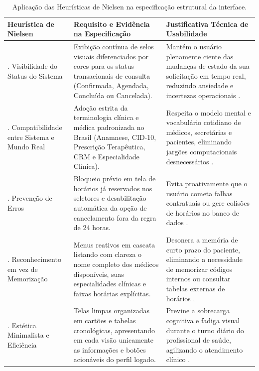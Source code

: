 \begin{table}[htbp]
\centering
\small
\caption{Aplicação das Heurísticas de Nielsen na especificação estrutural da interface.}
\label{tab:nielsen}
\begin{tabularx}{\textwidth}{|>{\RaggedRight\arraybackslash}p{4cm}|>{\RaggedRight\arraybackslash}X|>{\RaggedRight\arraybackslash}p{5.2cm}|}
\hline
\textbf{Heurística de Nielsen} & \textbf{Requisito e Evidência na Especificação} & \textbf{Justificativa Técnica de Usabilidade} \\
\hline
1. Visibilidade do Status do Sistema & Exibição contínua de selos visuais diferenciados por cores para os status transacionais de consulta (Confirmada, Agendada, Concluída ou Cancelada). & Mantém o usuário plenamente ciente das mudanças de estado da sua solicitação em tempo real, reduzindo ansiedade e incertezas operacionais \cite{nielsen1993}. \\
\hline
2. Compatibilidade entre Sistema e Mundo Real & Adoção estrita da terminologia clínica e médica padronizada no Brasil (Anamnese, CID-10, Prescrição Terapêutica, CRM e Especialidade Clínica). & Respeita o modelo mental e vocabulário cotidiano de médicos, secretárias e pacientes, eliminando jargões computacionais desnecessários \cite{norman2013}. \\
\hline
3. Prevenção de Erros & Bloqueio prévio em tela de horários já reservados nos seletores e desabilitação automática da opção de cancelamento fora da regra de 24 horas. & Evita proativamente que o usuário cometa falhas contratuais ou gere colisões de horários no banco de dados \cite{shneiderman2016}. \\
\hline
4. Reconhecimento em vez de Memorização & Menus reativos em cascata listando com clareza o nome completo dos médicos disponíveis, suas especialidades clínicas e faixas horárias explícitas. & Desonera a memória de curto prazo do paciente, eliminando a necessidade de memorizar códigos internos ou consultar tabelas externas de horários \cite{nielsen1993}. \\
\hline
5. Estética Minimalista e Eficiência & Telas limpas organizadas em cartões e tabelas cronológicas, apresentando em cada visão unicamente as informações e botões acionáveis do perfil logado. & Previne a sobrecarga cognitiva e fadiga visual durante o turno diário do profissional de saúde, agilizando o atendimento clínico \cite{norman2013}. \\
\hline
\end{tabularx}\\
\autoria
\end{table}
